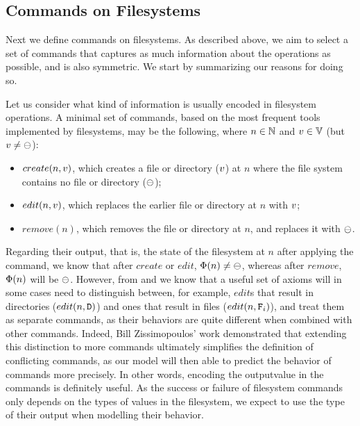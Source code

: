 
\subsection{Commands on Filesystems}


Next we define commands on filesystems.
As described above, we aim to select a set of commands
that captures as much information
about the operations as possible, and is also symmetric.
We start by summarizing our reasons for doing so.


Let us consider what kind of information is usually encoded in filesystem operations.
A minimal set of commands, based on the most frequent tools implemented by filesystems,
may be the following, where 
$n\in\mathbb{N}$ and $v\in\mathbb{V}$ (but $v\neq\ominus$):
\begin{itemize}
\item $create(n,v)$, which creates a file or directory ($v$) at $n$
where the file system contains no file or directory ($\ominus$);
\item $edit(n,v)$, which replaces the earlier file or directory at $n$ with $v$;
\item $remove(n)$, which removes the file or directory at $n$, and replaces it with $\ominus$.
\end{itemize}
Regarding their output, that is, the state of the filesystem at $n$
after applying the command,
we know that after $create$ or $edit$, $\Phi(n)\neq\ominus$, whereas after $remove$,
$\Phi(n)$ will be $\ominus$. 
However, from \cite{NREC} and \cite{CBNR} we know that a useful set of axioms
will in some cases need to distinguish between, for example,
$edit$s that result in directories ($edit(n,\mathtt{D})$) and
ones that result in files ($edit(n,\mathtt{F}_i)$), and treat them as separate commands,
as their behaviors are quite different when combined with other commands.
Indeed, Bill Zissimopoulos' work
demonstrated \cite{BZ}
that extending this distinction to more commands ultimately simplifies
the definition of conflicting commands, as our model will then able to predict the behavior of commands
more precisely.
In other words, encoding the outputvalue in the commands is definitely useful.
As the success or failure of filesystem commands only depends on the types of values in the filesystem,
we expect to use the type of their output when modelling their behavior.

